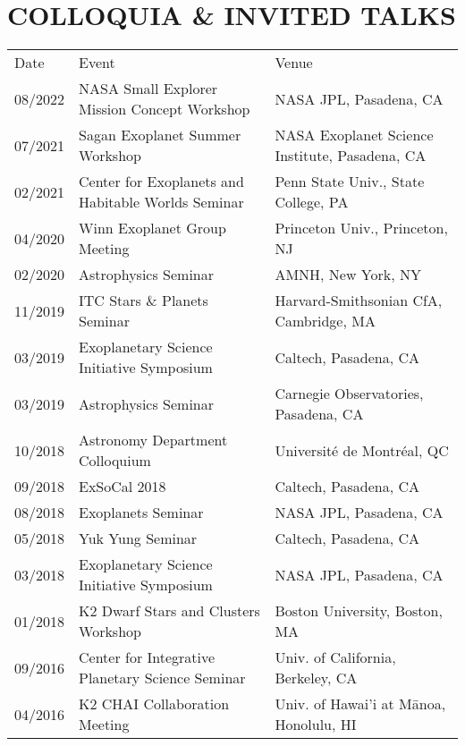 \section{\large COLLOQUIA \& INVITED TALKS}
\begin{tabular}{lll}
{\sc  Date}  & {\sc  Event} & {\sc  Venue} \\
08/2022 & NASA Small Explorer Mission Concept Workshop & NASA JPL, Pasadena, CA\\
07/2021 & Sagan Exoplanet Summer Workshop & NASA Exoplanet Science Institute, Pasadena, CA \\ %
02/2021 & Center for Exoplanets and Habitable Worlds Seminar & Penn State Univ., State College, PA \\ %
04/2020 & Winn Exoplanet Group Meeting & Princeton Univ., Princeton, NJ\\ %
02/2020 & Astrophysics Seminar & AMNH, New York, NY\\ %
11/2019 & ITC Stars \& Planets Seminar &  Harvard-Smithsonian CfA, Cambridge, MA\\ %
03/2019 & Exoplanetary Science Initiative Symposium & Caltech, Pasadena, CA \\ %
03/2019 & Astrophysics Seminar & Carnegie Observatories, Pasadena, CA \\ %
10/2018 & Astronomy Department Colloquium & 
Universit\'{e} de Montr\'{e}al, QC \\ %
09/2018 & ExSoCal 2018 & Caltech, Pasadena, CA \\ %
08/2018 & Exoplanets Seminar & NASA JPL, Pasadena, CA \\ %
05/2018 & Yuk Yung Seminar & Caltech, Pasadena, CA \\%
03/2018 & Exoplanetary Science Initiative Symposium & NASA JPL, Pasadena, CA \\ 
01/2018 & K2 Dwarf Stars and Clusters Workshop & Boston University, Boston, MA \\ %
09/2016 & Center for Integrative Planetary Science Seminar & Univ. of California, Berkeley, CA \\ %
04/2016 & K2 CHAI Collaboration Meeting & Univ. of Hawai'i at M\={a}noa, Honolulu, HI \\ %
\end{tabular}